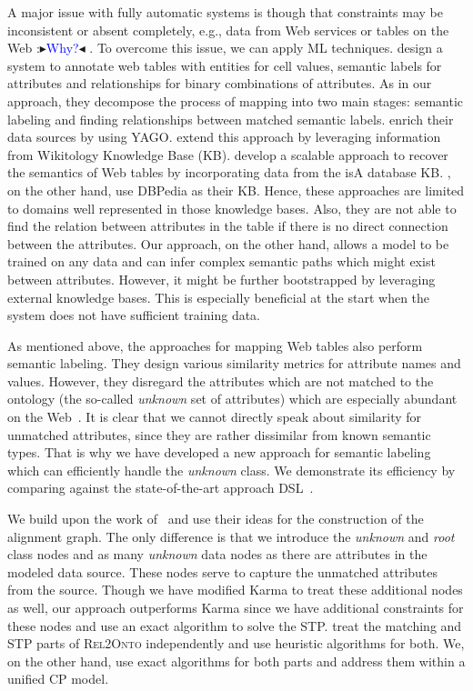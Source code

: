 \documentclass[letterpaper]{article} %
\newcommand{\authornote}[3]{
  {\fbox{\sc 
  #1}:$\blacktriangleright$\textcolor{#2}{\small{#3}}$\blacktriangleleft$}%
}
\newcommand{\ddg}[1]{\authornote{DDG}{blue}{#1}}
\newcommand{\relonto}{\textsc{Rel2Onto}}
\begin{document}
A major issue with fully automatic systems is though that constraints may be inconsistent or absent completely, e.g., data from Web services or tables on the Web \ddg{Why?}.
To overcome this issue, we can apply ML techniques.
\cite{Limaye:Annotating} design a system to annotate web tables with entities for cell values, semantic labels for attributes and relationships for binary combinations of attributes.
As in our approach, they decompose the process of mapping into two main stages: semantic labeling and finding relationships between matched semantic labels.
\cite{Limaye:Annotating} enrich their data sources by using YAGO.
\cite{Mulwad:Semantic} extend this approach by leveraging information from Wikitology Knowledge Base (KB).
\cite{Venetis:Recovering} develop a scalable approach to recover the semantics of Web tables by incorporating data from the isA database KB.
\cite{Ritze:matching}, on the other hand, use DBPedia as their KB.
Hence, these approaches are limited to domains well represented in those knowledge bases.
Also, they are not able to find the relation between attributes in the table if there is no direct connection between the attributes.
Our approach, on the other hand, allows a model to be trained on any data and can infer complex semantic paths which might exist between attributes.
However, it might be further bootstrapped by leveraging external knowledge bases.
This is especially beneficial at the start when the system does not have sufficient training data.

As mentioned above, the approaches for mapping Web tables also perform semantic labeling.
They design various similarity metrics for attribute names and values.
However, they disregard the attributes which are not matched to the ontology (the so-called \emph{unknown} set of attributes) which are especially abundant on the Web~\cite{Ritze:matching}\cite{Pham:semantic}.
It is clear that we cannot directly speak about similarity for unmatched attributes, since they are rather dissimilar from known semantic types.
That is why we have developed a new approach for semantic labeling which can efficiently handle the \emph{unknown} class.
We demonstrate its efficiency by comparing against the state-of-the-art approach DSL~\cite{Pham:semantic}.

We build upon the work of~\cite{taheriyan2016learning} and use their ideas for the construction of the alignment graph.
The only difference is that we introduce the \emph{unknown} and \emph{root} class nodes and as many \emph{unknown} data nodes as there are attributes in the modeled data source.
These nodes serve to capture the unmatched attributes from the source.
Though we have modified Karma to treat these additional nodes as well, our approach outperforms Karma since we have additional constraints for these nodes and use an exact algorithm to solve the STP.
\cite{taheriyan2016learning} treat the matching and STP parts of \relonto{} independently and use heuristic algorithms for both.
We, on the other hand, use exact algorithms for both parts and address them within a unified CP model.
\end{document}
